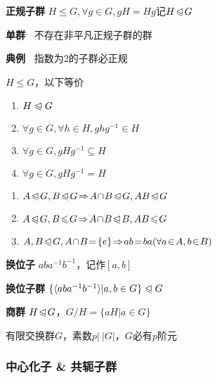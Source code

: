 \documentclass[a4paper,10pt]{ctexart}
\newcommand*{\impl}{\Rightarrow}
\renewcommand*{\leq}{\leqslant}
\newcommand*{\nmsubgroupeq}{\trianglelefteqslant}
\newcommand*{\gengroup}[1]{\langle #1 \rangle}
\begin{document}
\begin{multicols}{3}
    \textbf{正规子群} $H \!\!\leq\!\! G, \forall g \!\in\! G, gH \! = \! Hg$记$H \!\nmsubgroupeq\! G$

    \textbf{单群\ } 不存在非平凡正规子群的群

    \textbf{典例\ } 指数为2的子群必正规

    \begin{theorem}[正规子群判则]
        $H \leq G$，以下等价
        \begin{enumerate}
            \item $H \nmsubgroupeq G$
            \item $\forall g \in G,\forall h \in H, ghg^{-1} \in H$
            \item $\forall g \in G, gHg^{-1} \subseteq H$
            \item $\forall g \in G, gHg^{-1} = H$
        \end{enumerate}
    \end{theorem}

    \begin{theorem}[正规子群运算律]
        \hfil

        \begin{enumerate}
            \item $A \!\nmsubgroupeq\! G, B \!\nmsubgroupeq\! G \!\impl\! A \!\cap\! B \!\nmsubgroupeq\! G, AB \!\nmsubgroupeq\! G$
            \item $A \!\nmsubgroupeq\! G, B \!\leq\! G \!\impl\! A \!\cap\! B \!\nmsubgroupeq\! B, AB \!\leq\! G$
            \item $A, B \!\nmsubgroupeq\! G, A \!\cap\! B \! = \! \{e\} \!\impl\! ab \! = \! ba \\ (\forall a \!\in\! A, b \!\in\! B)$
        \end{enumerate}
    \end{theorem}

    \textbf{换位子} $aba^{-1}b^{-1}$，记作$[a,b]$

    \textbf{换位子群} $\{ \gengroup{aba^{-1}b^{-1}} | a, b \in G \} \nmsubgroupeq G$

    \textbf{商群} $H \!\nmsubgroupeq\! G$，$G/H = \{ aH | a \in G \}$

    \begin{theorem}[素阶元]
        有限交换群$G$，素数$p|\ |G|$，$G$必有$p$阶元
    \end{theorem}

    \subsubsection{中心化子 \& 共轭子群}


\end{multicols}
\end{document}
